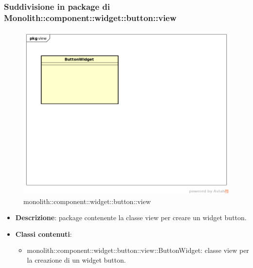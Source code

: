 \subsubsection{Suddivisione in package  di Monolith::component::widget::button::view}
\label{monolith::component::widget::button::view}
\begin{figure}[H]
	\centering
	\includegraphics[scale=0.5]{Sezioni/imgPackage/component_widget_button_view.png}
	\caption{monolith::component::widget::button::view}
\end{figure}
\begin{itemize}
	\item{\textbf{Descrizione}}: package contenente la classe view per creare un widget button.
	\item{\textbf{Classi contenuti}}:
	\begin{itemize}
	\item{monolith::component::widget::button::view::ButtonWidget}: classe view per la creazione di un widget button.
	\end{itemize}
\end{itemize}


